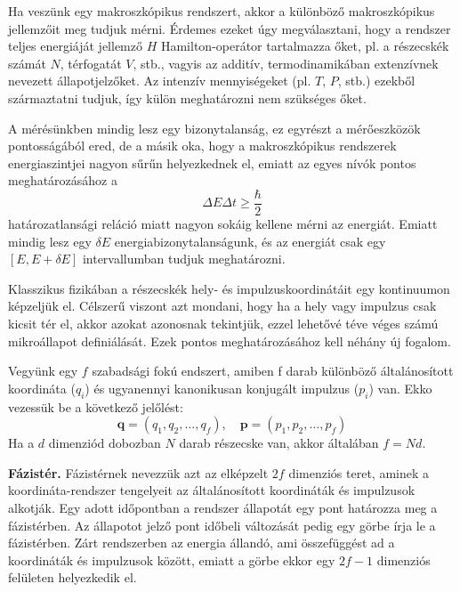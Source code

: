 \documentclass[../main.tex]{subfiles}
\begin{document}
Ha veszünk egy makroszkópikus rendszert, akkor a különböző makroszkópikus jellemzőit meg tudjuk mérni. Érdemes ezeket úgy megválasztani, hogy a rendszer teljes energiáját jellemző $H$ Hamilton-operátor
tartalmazza őket, pl. a részecskék számát $N$, térfogatát $V$, stb., vagyis az additív, termodinamikában extenzívnek nevezett állapotjelzőket. Az intenzív mennyiségeket (pl. $T$, $P$, stb.) 
ezekből származtatni tudjuk, így külön meghatározni nem szükséges őket.

A mérésünkben mindig lesz egy bizonytalanság, ez egyrészt a mérőeszközök pontosságából ered, de a másik oka, hogy a makroszkópikus rendszerek energiaszintjei nagyon sűrűn helyezkednek el, emiatt az egyes nívók pontos meghatározásához a
\begin{equation}
    \Delta E \Delta t \geq \frac{\hbar}{2}
\end{equation}
határozatlansági reláció miatt nagyon sokáig kellene mérni az energiát. Emiatt mindig lesz egy $\delta E$ energiabizonytalanságunk, és az energiát csak egy $[E, E + \delta E]$ intervallumban tudjuk meghatározni.

Klasszikus fizikában a részecskék hely- és impulzuskoordinátáit egy kontinuumon képzeljük el. Célszerű viszont azt mondani, hogy ha a hely vagy impulzus csak kicsit tér el, akkor azokat azonosnak tekintjük, ezzel 
lehetővé téve véges számú mikroállapot definiálását. Ezek pontos meghatározásához kell néhány új fogalom.

Vegyünk egy $f$ szabadsági fokú endszert, amiben f darab különböző általánosított koordináta ($q_i$) és ugyanennyi kanonikusan konjugált impulzus ($p_i$) van. Ekko vezessük be a következő jelőlést:
\begin{equation}
    \mathbf{q} = (q_1, q_2, \ldots, q_f), \quad \mathbf{p} = (p_1, p_2, \ldots, p_f)
\end{equation}
Ha a $d$ dimenziód dobozban $N$ darab részecske van, akkor általában $f = Nd$.

\textbf{Fázistér.} Fázistérnek nevezzük azt az elképzelt $2f$ dimenziós teret, aminek a koordináta-rendszer tengelyeit az általánosított koordináták és impulzusok alkotják.
Egy adott időpontban a rendszer állapotát egy pont határozza meg a fázistérben. Az állapotot jelző pont időbeli változását pedig egy görbe írja le a fázistérben. Zárt rendszerben az energia állandó,
ami összefüggést ad a koordináták és impulzusok között, emiatt a görbe ekkor egy $2f - 1$ dimenziós felületen helyezkedik el.
\end{document}
